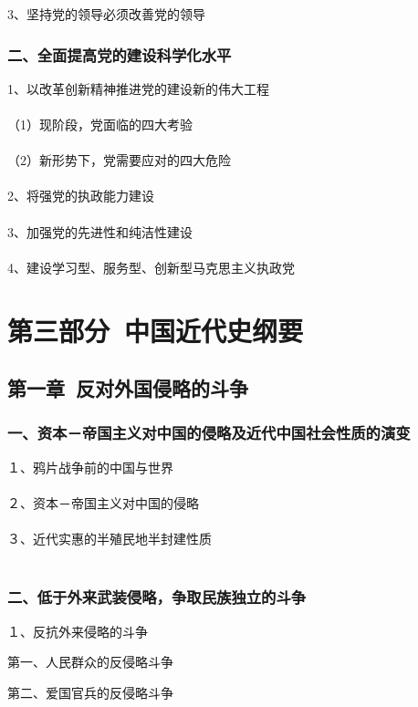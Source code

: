 \documentclass{ctexart}
\begin{document}
3、坚持党的领导必须改善党的领导
\subsubsection{二、全面提高党的建设科学化水平}
1、以改革创新精神推进党的建设新的伟大工程
\\\\
（1）现阶段，党面临的四大考验
\\\\
（2）新形势下，党需要应对的四大危险
\\\\

2、将强党的执政能力建设
\\\\

3、加强党的先进性和纯洁性建设
\\\\

4、建设学习型、服务型、创新型马克思主义执政党

\section{第三部分\ 中国近代史纲要}

\subsection{第一章\ 反对外国侵略的斗争}

\subsubsection{一、资本－帝国主义对中国的侵略及近代中国社会性质的演变}
１、鸦片战争前的中国与世界
\\\\

２、资本－帝国主义对中国的侵略
\\\\


３、近代实惠的半殖民地半封建性质
\\\\


\subsubsection{二、低于外来武装侵略，争取民族独立的斗争}
１、反抗外来侵略的斗争

第一、人民群众的反侵略斗争

第二、爱国官兵的反侵略斗争
\\\\
\end{document}
